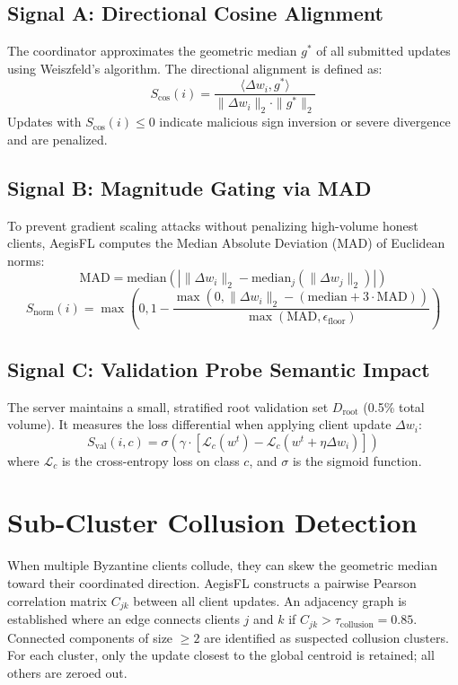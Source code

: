 \documentclass[12pt,a4paper]{report}
\begin{document}
\subsection{Signal A: Directional Cosine Alignment}
The coordinator approximates the geometric median $g^*$ of all submitted updates using Weiszfeld's algorithm. The directional alignment is defined as:
\begin{equation}
S_{\text{cos}}(i) = \frac{\langle \Delta w_i, g^* \rangle}{\|\Delta w_i\|_2 \cdot \|g^*\|_2}
\end{equation}
Updates with $S_{\text{cos}}(i) \le 0$ indicate malicious sign inversion or severe divergence and are penalized.

\subsection{Signal B: Magnitude Gating via MAD}
To prevent gradient scaling attacks without penalizing high-volume honest clients, AegisFL computes the Median Absolute Deviation (MAD) of Euclidean norms:
\begin{equation}
\text{MAD} = \text{median}\left( \left| \|\Delta w_i\|_2 - \text{median}_j(\|\Delta w_j\|_2) \right| \right)
\end{equation}
\begin{equation}
S_{\text{norm}}(i) = \max\left(0, 1 - \frac{\max(0, \|\Delta w_i\|_2 - (\text{median} + 3\cdot\text{MAD}))}{\max(\text{MAD}, \epsilon_{\text{floor}})}\right)
\end{equation}

\subsection{Signal C: Validation Probe Semantic Impact}
The server maintains a small, stratified root validation set $D_{\text{root}}$ (0.5\% total volume). It measures the loss differential when applying client update $\Delta w_i$:
\begin{equation}
S_{\text{val}}(i, c) = \sigma\left( \gamma \cdot \left[ \mathcal{L}_c(w^t) - \mathcal{L}_c(w^t + \eta \Delta w_i) \right] \right)
\end{equation}
where $\mathcal{L}_c$ is the cross-entropy loss on class $c$, and $\sigma$ is the sigmoid function.

\section{Sub-Cluster Collusion Detection}
When multiple Byzantine clients collude, they can skew the geometric median toward their coordinated direction. AegisFL constructs a pairwise Pearson correlation matrix $C_{jk}$ between all client updates. An adjacency graph is established where an edge connects clients $j$ and $k$ if $C_{jk} > \tau_{\text{collusion}} = 0.85$. Connected components of size $\ge 2$ are identified as suspected collusion clusters. For each cluster, only the update closest to the global centroid is retained; all others are zeroed out.
\end{document}
